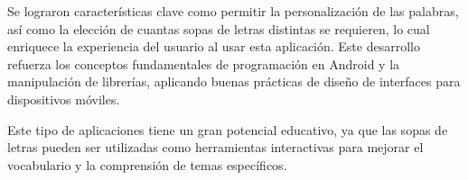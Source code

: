 \documentclass[conference]{IEEEtran}
\begin{document}
Se lograron características clave como permitir la personalización de las palabras, así como la elección de cuantas sopas de letras distintas se requieren, lo cual enriquece la experiencia del usuario al usar esta aplicación. Este desarrollo refuerza los conceptos fundamentales de programación en Android y la manipulación de librerías, aplicando buenas prácticas de diseño de interfaces para dispositivos móviles.

Este tipo de aplicaciones tiene un gran potencial educativo, ya que las sopas de letras pueden ser utilizadas como herramientas interactivas para mejorar el vocabulario y la comprensión de temas específicos.

\vspace{3cm}

\printbibliography
\end{document}
